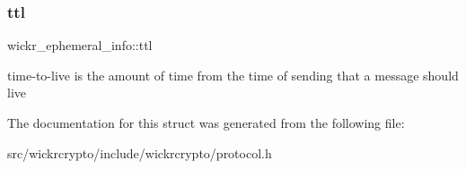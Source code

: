 \subsubsection{\texorpdfstring{ttl}{ttl}}
{\footnotesize\ttfamily wickr\+\_\+ephemeral\+\_\+info\+::ttl}

time-\/to-\/live is the amount of time from the time of sending that a message should live 

The documentation for this struct was generated from the following file\+:\begin{DoxyCompactItemize}
\item 
src/wickrcrypto/include/wickrcrypto/protocol.\+h\end{DoxyCompactItemize}
